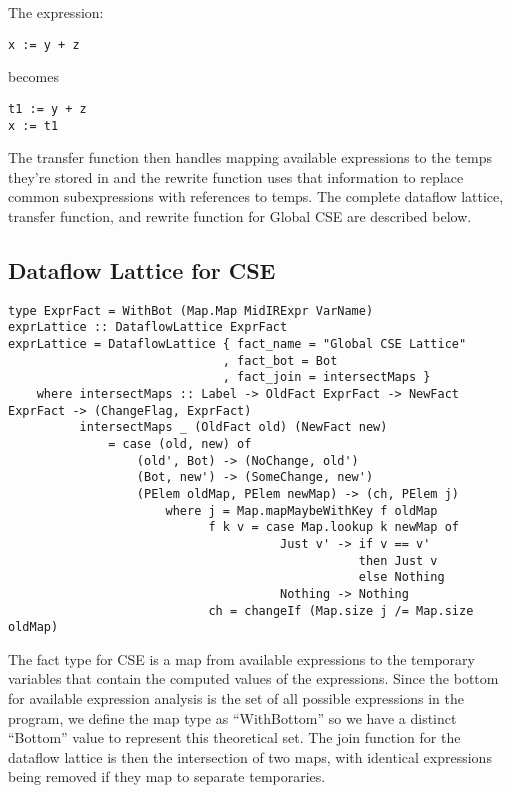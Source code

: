 \documentclass[11pt]{article}
\begin{document}
\noindent The expression: 
\begin{verbatim}
x := y + z
\end{verbatim}

\noindent becomes 

\begin{verbatim}
t1 := y + z
x := t1
\end{verbatim}

The transfer function then handles mapping available expressions to the temps they're stored in and the rewrite function uses that information to replace common subexpressions with references to temps. The complete dataflow lattice, transfer function, and rewrite function for Global CSE are described below. 

\subsection {Dataflow Lattice for CSE }

{\small\begin{verbatim}
type ExprFact = WithBot (Map.Map MidIRExpr VarName)
exprLattice :: DataflowLattice ExprFact 
exprLattice = DataflowLattice { fact_name = "Global CSE Lattice"
                              , fact_bot = Bot
                              , fact_join = intersectMaps }
    where intersectMaps :: Label -> OldFact ExprFact -> NewFact ExprFact -> (ChangeFlag, ExprFact)
          intersectMaps _ (OldFact old) (NewFact new) 
              = case (old, new) of 
                  (old', Bot) -> (NoChange, old') 
                  (Bot, new') -> (SomeChange, new') 
                  (PElem oldMap, PElem newMap) -> (ch, PElem j)
                      where j = Map.mapMaybeWithKey f oldMap
                            f k v = case Map.lookup k newMap of 
                                      Just v' -> if v == v' 
                                                 then Just v 
                                                 else Nothing
                                      Nothing -> Nothing 
                            ch = changeIf (Map.size j /= Map.size oldMap)
\end{verbatim}}

The fact type for CSE is a map from available expressions to the temporary variables that contain the computed values of the expressions. Since the bottom for available expression analysis is the set of all possible expressions in the program, we define the map type as ``WithBottom'' so we have a distinct ``Bottom'' value to represent this theoretical set. The join function for the dataflow lattice is then the intersection of two maps, with identical expressions being removed if they map to separate temporaries. 
\end{document}
